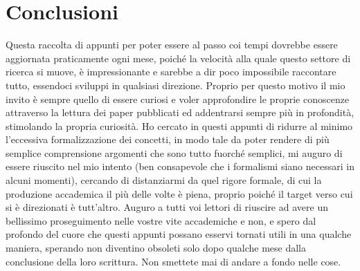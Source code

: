 \chapter*{Conclusioni}

Questa raccolta di appunti per poter essere al passo coi tempi dovrebbe essere aggiornata praticamente ogni mese, poiché la velocità alla quale questo settore di ricerca si muove, è impressionante e sarebbe a dir poco impossibile raccontare tutto, essendoci sviluppi in qualsiasi direzione. Proprio per questo motivo il mio invito è sempre quello di essere curiosi e voler approfondire le proprie conoscenze attraverso la lettura dei paper pubblicati ed addentrarsi sempre più in profondità, stimolando la propria curiosità. Ho cercato in questi appunti di ridurre al minimo l'eccessiva formalizzazione dei concetti, in modo tale da poter rendere di più semplice comprensione argomenti che sono tutto fuorché semplici, mi auguro di essere riuscito nel mio intento (ben consapevole che i formalismi siano necessari in alcuni momenti), cercando di distanziarmi da quel rigore formale, di cui la produzione accademica il più delle volte è piena, proprio poiché il target verso cui si è direzionati è tutt'altro. Auguro a tutti voi lettori di riuscire ad avere un bellissimo proseguimento nelle vostre vite accademiche e non, e spero dal profondo del cuore che questi appunti possano esservi tornati utili in una qualche maniera, sperando non diventino obsoleti solo dopo qualche mese dalla conclusione della loro scrittura. Non smettete mai di andare a fondo nelle cose.